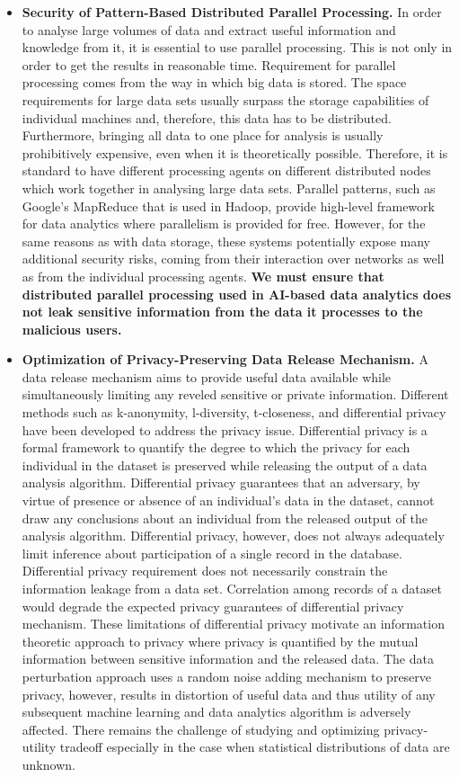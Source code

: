 \documentclass[a4paper,11pt]{article}
\begin{document}
\begin{itemize}
\item \textbf{Security of Pattern-Based Distributed Parallel Processing.} In order to analyse large volumes of data and extract useful information and knowledge from it, it is essential to use parallel processing. This is not only in order to get the results in reasonable time. Requirement for parallel processing comes from the way in which big data is stored. The space requirements for large data sets usually surpass the storage capabilities of individual machines and, therefore, this data has to be distributed. Furthermore, bringing all data to one place for analysis is usually prohibitively expensive, even when it is theoretically possible. Therefore, it is standard to have different processing agents on different distributed nodes which work together in analysing large data sets. Parallel patterns, such as Google's MapReduce that is used in Hadoop, provide high-level framework for data analytics where parallelism is provided for free. However, for the same reasons as with data storage, these systems potentially expose many additional security risks, coming from their interaction over networks as well as from the individual processing agents. \textbf{We must ensure that distributed parallel processing used in AI-based data analytics does not leak sensitive information from the data it processes to the malicious users.}

\item \textbf{Optimization of Privacy-Preserving Data Release Mechanism.} A data release mechanism aims to provide useful data available while simultaneously limiting any reveled sensitive or private information. Different methods such as k-anonymity, l-diversity, t-closeness, and differential privacy have been developed to address the privacy issue. Differential privacy is a formal framework to quantify the degree to which the privacy for each individual in the dataset is preserved while releasing the output of a data analysis algorithm. Differential privacy guarantees that an adversary, by virtue of presence or absence of an individual's data in the dataset, cannot draw any conclusions about an individual from the released output of the analysis algorithm. Differential privacy, however, does not always adequately limit inference about participation of a single record in the database. Differential privacy requirement does not necessarily constrain the information leakage from a data set. Correlation among records of a dataset would degrade the expected privacy guarantees of differential privacy mechanism. These limitations of differential privacy motivate an information theoretic approach to privacy where privacy is quantified by the mutual information between sensitive information and the released data. The data perturbation approach uses a random noise adding mechanism to preserve privacy, however, results in distortion of useful data and thus utility of any subsequent machine learning and data analytics algorithm is adversely affected. There remains the challenge of studying and optimizing privacy-utility tradeoff especially in the case when statistical distributions of data are unknown. 


\end{itemize}
\end{document}
